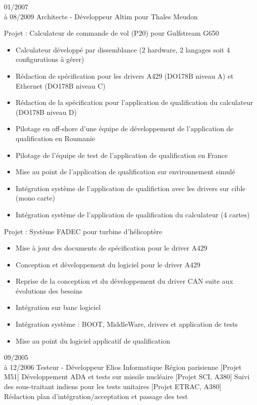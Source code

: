 \documentclass[10pt,a4paper]{moderncv}       %
\begin{document}
\vspace*{3mm}
\cventry
{01/2007\\à 08/2009}       %
{Architecte - Développeur} %
{Altim pour Thales}        %
{Meudon}                   %
{}                         %
{
Projet : Calculateur de commande de vol (P20) pour Gulfstream G650
\begin{itemize}
\setlength{\itemindent}{2mm}
  \item Calculateur développé par dissemblance (2 hardware, 2 langages soit 4 configurations à gérer)
  \item Rédaction de spécification pour les drivers A429 (DO178B niveau A) et Ethernet (DO178B niveau C)
  \item Rédaction de la spécification pour l'application de qualification du calculateur (DO178B niveau D)
  \item Pilotage en off-shore d'une équipe de développement de l'application de qualification en Roumanie
  \item Pilotage de l'équipe de test de l'application de qualification en France
  \item Mise au point de l'application de qualification sur environnement simulé
  \item Intégration système de l'application de qualifiction avec les drivers sur cible (mono carte)
  \item Intégration système de l'application de qualification du calculateur (4 cartes)
\end{itemize}
Projet : Système FADEC pour turbine d'hélicoptère
\begin{itemize}
\setlength{\itemindent}{2mm}
  \item Mise à jour des documents de spécification pour le driver A429
  \item Conception et développement du logiciel pour le driver A429
  \item Reprise de la conception et du développement du driver CAN suite aux évolutions des besoins
  \item Intégration sur banc logiciel
  \item Intégration système : BOOT, MiddleWare, drivers et application de tests
  \item Mise au point du logiciel applicatif de qualification
\end{itemize}
}
\vspace*{3mm}
\cventry
{09/2005\\à 12/2006}    %
{Testeur - Développeur} %
{Elios Informatique}    %
{Région parisienne}     %
{}                      %
{
[Projet M51] Développement ADA et tests sur missile nucléaire
\newline{}
[Projet SCI, A380] Suivi des sous-traitant indiens pour les tests unitaires
\newline{}
[Projet ETRAC, A380] Rédaction plan d’intégration/acceptation et passage
  des test
}
\end{document}

